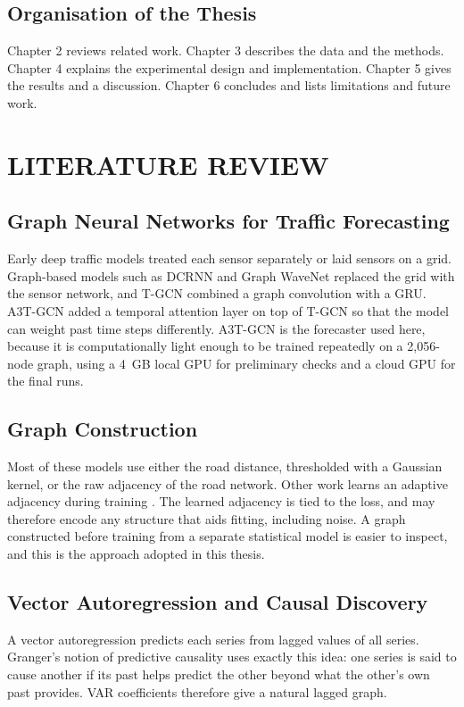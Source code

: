 \documentclass[MTech]{ugthesis}
\begin{document}
\section{Organisation of the Thesis}
Chapter 2 reviews related work. Chapter 3 describes the data and the methods. Chapter 4 explains the experimental design and implementation. Chapter 5 gives the results and a discussion. Chapter 6 concludes and lists limitations and future work.

\chapter{LITERATURE REVIEW}

\section{Graph Neural Networks for Traffic Forecasting}
Early deep traffic models treated each sensor separately or laid sensors on a grid. Graph-based models such as DCRNN \citep{li2018dcrnn} and Graph WaveNet \citep{wu2019graphwavenet} replaced the grid with the sensor network, and T-GCN \citep{zhao2019tgcn} combined a graph convolution with a GRU. A3T-GCN \citep{zhu2020a3tgcn} added a temporal attention layer on top of T-GCN so that the model can weight past time steps differently. A3T-GCN is the forecaster used here, because it is computationally light enough to be trained repeatedly on a 2,056-node graph, using a 4~GB local GPU for preliminary checks and a cloud GPU for the final runs.

\section{Graph Construction}
Most of these models use either the road distance, thresholded with a Gaussian kernel, or the raw adjacency of the road network. Other work learns an adaptive adjacency during training \citep{wu2019graphwavenet}. The learned adjacency is tied to the loss, and may therefore encode any structure that aids fitting, including noise. A graph constructed before training from a separate statistical model is easier to inspect, and this is the approach adopted in this thesis.

\section{Vector Autoregression and Causal Discovery}
A vector autoregression predicts each series from lagged values of all series. Granger's notion of predictive causality \citep{granger1969} uses exactly this idea: one series is said to cause another if its past helps predict the other beyond what the other's own past provides. VAR coefficients therefore give a natural lagged graph.
\end{document}

